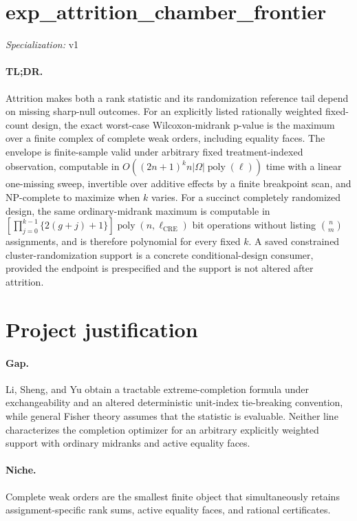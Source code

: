 \documentclass{article}
\begin{document}
\sloppy

\section*{exp\_\allowbreak{}attrition\_\allowbreak{}chamber\_\allowbreak{}frontier}

\noindent\textit{Specialization:} v1\par

\paragraph{TL;DR.} Attrition makes both a rank statistic and its randomization reference tail depend on missing sharp-null outcomes. For an explicitly listed rationally weighted fixed-count design, the exact worst-case Wilcoxon-midrank p-value is the maximum over a finite complex of complete weak orders, including equality faces. The envelope is finite-sample valid under arbitrary fixed treatment-indexed observation, computable in \(O((2n+1)^k n|\Omega|\operatorname{poly}(\ell))\) time with a linear one-missing sweep, invertible over additive effects by a finite breakpoint scan, and NP-complete to maximize when \(k\) varies. For a succinct completely randomized design, the same ordinary-midrank maximum is computable in \(\left[\prod_{j=0}^{k-1}\{2(g+j)+1\}\right]\operatorname{poly}(n,\ell_{\mathrm{CRE}})\) bit operations without listing \(\binom{n}{m}\) assignments, and is therefore polynomial for every fixed \(k\). A saved constrained cluster-randomization support is a concrete conditional-design consumer, provided the endpoint is prespecified and the support is not altered after attrition.

\section{Project justification}

\paragraph{Gap.} Li, Sheng, and Yu obtain a tractable extreme-completion formula under exchangeability and an altered deterministic unit-index tie-breaking convention, while general Fisher theory assumes that the statistic is evaluable. Neither line characterizes the completion optimizer for an arbitrary explicitly weighted support with ordinary midranks and active equality faces.

\paragraph{Niche.} Complete weak orders are the smallest finite object that simultaneously retains assignment-specific rank sums, active equality faces, and rational certificates.
\end{document}
